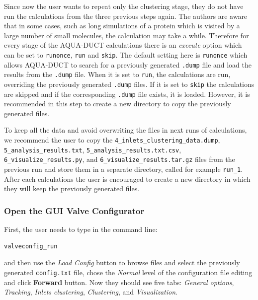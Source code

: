 \documentclass[9pt,tutorial, pubversion]{livecoms}
\begin{document}
Since now the user wants to repeat only the clustering stage, they do not have run the calculations from the three previous steps again. The authors are aware that in some cases, such as long simulations of a protein which is visited by a large number of small molecules, the calculation may take a while. Therefore for every stage of the AQUA-DUCT calculations there is an \textit{execute} option which can be set to \texttt{runonce}, \texttt{run} and \texttt{skip}. The default setting here is \texttt{runonce} which allows AQUA-DUCT to search for a previously generated \texttt{.dump} file and load the results from the \texttt{.dump} file. When it is set to \texttt{run}, the calculations are run, overriding the previously generated \texttt{.dump} files. If it is set to \texttt{skip} the calculations are skipped and if the corresponding \texttt{.dump} file exists, it is loaded. However, it is recommended in this step to create a new directory to copy the previously generated files.

To keep all the data and avoid overwriting the files in next runs of calculations, we recommend the user to copy the \texttt{4\_inlets\_clustering\_data.dump}, \texttt{5\_analysis\_results.txt}, \texttt{5\_analysis\_results.txt.csv}, \texttt{6\_visualize\_results.py}, and \texttt{6\_visualize\_results.tar.gz} files from the previous run and store them in a separate directory, called for example \texttt{run\_1}. After each calculations the user is encouraged to create a new directory in which they will keep the previously generated files.

\subsubsection{Open the GUI Valve Configurator}
First, the user needs to type in the command line:
\begin{lstlisting}
valveconfig_run
\end{lstlisting}
and then use the \textit{Load Config} button to browse files and select the previously generated \texttt{config.txt} file, chose the \textit{Normal} level of the configuration file editing and click \textbf{Forward} button. Now they should see five tabs: \textit{General options}, \textit{Tracking}, \textit{Inlets clustering}, \textit{Clustering}, and \textit{Visualization}.
\end{document}
